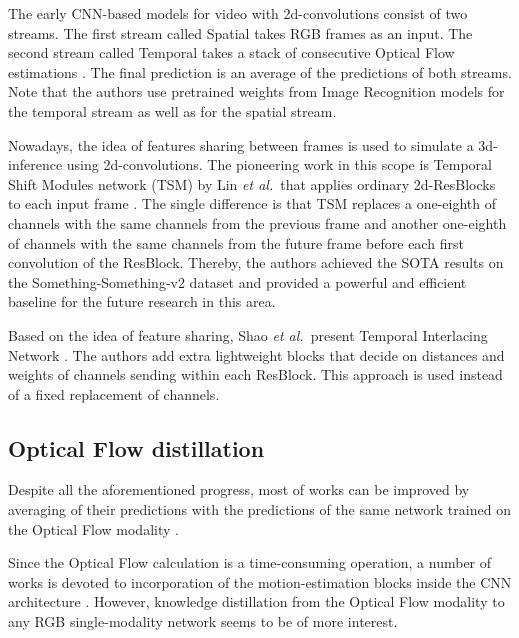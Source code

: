 \documentclass[conference]{IEEEtran}
\begin{document}
The early CNN-based models for video with 2d-convolutions consist of two streams. The first stream called Spatial takes RGB frames as an input. The second stream called Temporal takes a stack of consecutive Optical Flow estimations \cite{simonyan2014two,wang2016temporal}. The final prediction is an average of the predictions of both streams. Note that the authors use pretrained weights from Image Recognition models for the temporal stream as well as for the spatial stream. 

Nowadays, the idea of features sharing between frames is used to simulate a 3d-inference using 2d-convolutions. The pioneering work in this scope is Temporal Shift Modules network (TSM) by Lin \textit{et al.}~that applies ordinary 2d-ResBlocks \cite{he2016deep} to each input frame \cite{lin2019tsm}. The single difference is that TSM replaces a one-eighth of channels with the same channels from the previous frame and another one-eighth of channels with the same channels from the future frame before each first convolution of the ResBlock. Thereby, the authors achieved the SOTA results on the Something-Something-v2 dataset \cite{goyal2017something} and provided a powerful and efficient baseline for the future research in this area.

Based on the idea of feature sharing, Shao \textit{et al.}~present Temporal Interlacing Network \cite{shao2020temporal}. The authors add extra lightweight blocks that decide on distances and weights of channels sending within each ResBlock. This approach is used instead of a fixed replacement of channels.

\subsection{Optical Flow distillation}

Despite all the aforementioned progress, most of works can be improved by averaging of their predictions with the predictions of the same network trained on the Optical Flow modality \cite{carreira2017quo,xie2018rethinking,tran2018closer,zolfaghari2018eco,wang2016temporal,lin2019tsm}.

Since the Optical Flow calculation is a time-consuming operation, a number of works is devoted to incorporation of the motion-estimation blocks inside the CNN architecture \cite{fan2018end,piergiovanni2019representation,jiang2019stm}. However, knowledge distillation from the Optical Flow modality to any RGB single-modality network seems to be of more interest.
\end{document}
